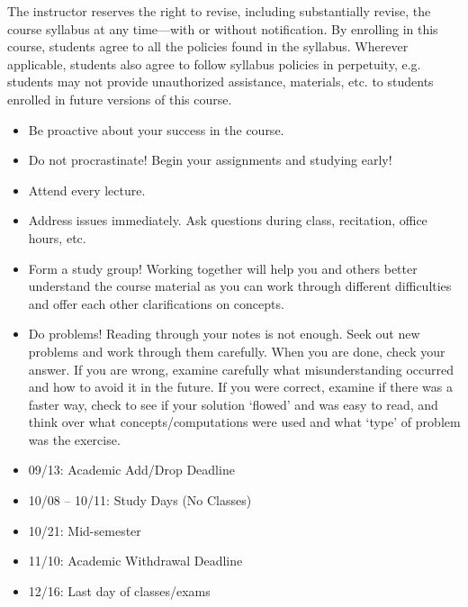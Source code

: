 \documentclass[11pt,letterpaper]{article}
\begin{document}
The instructor reserves the right to revise, including substantially revise, the course syllabus at any time---with or without notification. By enrolling in this course, students agree to all the policies found in the syllabus. Wherever applicable, students also agree to follow syllabus policies in perpetuity, e.g. students may not provide unauthorized assistance, materials, etc. to students enrolled in future versions of this course. 
\sectionbreak



\begin{itemize} \itemsep=0.3ex
\item Be proactive about your success in the course.
\item Do not procrastinate! Begin your assignments and studying early!
\item Attend every lecture.
\item Address issues immediately. Ask questions during class, recitation, office hours, etc. 
\item Form a study group! Working together will help you and others better understand the course material as you can work through different difficulties and offer each other clarifications on concepts.
\item Do problems! Reading through your notes is not enough. Seek out new problems and work through them carefully. When you are done, check your answer. If you are wrong, examine carefully what misunderstanding occurred and how to avoid it in the future. If you were correct, examine if there was a faster way, check to see if your solution `flowed' and was easy to read, and think over what concepts/computations were used and what `type' of problem was the exercise.
\end{itemize}
\sectionbreak



\begin{itemize} \itemsep=0.3ex
\item 09/13: Academic Add/Drop Deadline
\item 10/08 -- 10/11: Study Days (No Classes)
\item 10/21: Mid-semester
\item 11/10: Academic Withdrawal Deadline
\item 12/16: Last day of classes/exams
\end{itemize}
\sectionbreak
\end{document}
